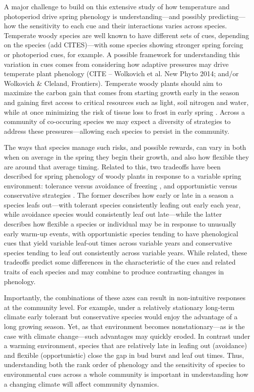 \documentclass[11pt]{article}
\begin{document}
A major challenge to build on this extensive study of how temperature and photoperiod drive spring phenology is understanding---and possibly predicting---how the sensitivity to each cue and their interactions varies across species. Temperate woody species are well known to  have different sets of cues, depending on the species \cite{Korner:2010} (add CITES)---with some species showing stronger spring forcing or photoperiod cues, for example. A possible framework for understanding this variation in cues comes from considering how adaptive pressures may drive temperate plant phenology (CITE -- Wolkovich et al. New Phyto 2014; and/or Wolkovich & Cleland, Frontiers). Temperate woody plants should aim to maximize the carbon gain that comes from starting growth early in the season and gaining first access to critical resources such as light, soil nitrogen and water, while at once minimizing the risk of tissue loss to frost in early spring \cite{Korner:2010,Gu:2008aa,Hufkens:2012aa}. Across a community of co-occuring species we may expect a diversity of strategies to address these pressures---allowing each species to persist in the community. 

The ways that species manage such risks, and possible rewards, can vary in both when on average in the spring they begin their growth, and also how flexible they are around that average timing. Related to this, two tradeoffs have been described for spring phenology of woody plants in response to a variable spring environment: tolerance versus avoidance of freezing \cite{Sakai:1987aa}, and opportunistic versus conservative strategies \cite{Korner:2010}. The former describes how early or late in a season a species leafs out---with tolerant species consistently leafing out early each year, while avoidance species would consistently leaf out late---while the latter describes how flexible a species or individual may be in response to unusually early warm-up events, with opportunistic species tending to have phenological cues that yield variable leaf-out times across variable years and conservative species tending to leaf out consistently across variable years. While related, these tradeoffs predict some differences in the characteristic of the cues and related traits of each species and may combine to produce contrasting changes in phenology. 

Importantly, the combinations of these axes can result in non-intuitive responses at the community level. For example, under a relatively stationary long-term climate early tolerant but conservative species would enjoy the advantage of a long growing season. Yet, as that environment becomes nonstationary---as is the case with climate change---such advantages may quickly eroded. In contrast under a warming environment, species that are relatively late in leafing out (avoidance) and flexible (opportunistic) close the gap in bud burst and leaf out times. Thus, understanding both the rank order of phenology and the sensitivity of species to environmental cues across a whole community is important in understanding how a changing climate will affect community dynamics. %
\end{document}
